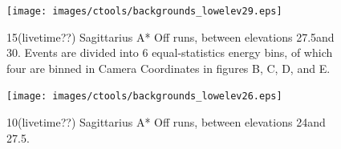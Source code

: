 \begin{figure}[ht]
  \begin{center}
    \texttt{[image: images/ctools/backgrounds\_lowelev29.eps]}
    \caption[CTOOLS Background at \degree Elevation]{15(livetime??) Sagittarius A* Off runs, between elevations 27.5\degree and 30\degree.  Events are divided into 6 equal-statistics energy bins, of which four are binned in Camera Coordinates in figures B, C, D, and E.}\label{fig:back_lowelev29}
  \end{center}
\end{figure}

\begin{figure}[ht]
  \begin{center}
    \texttt{[image: images/ctools/backgrounds\_lowelev26.eps]}
    \caption[CTOOLS Background at \degree Elevation]{10(livetime??) Sagittarius A* Off runs, between elevations 24\degree and 27.5\degree.}\label{fig:back_lowelev26}
  \end{center}
\end{figure}






